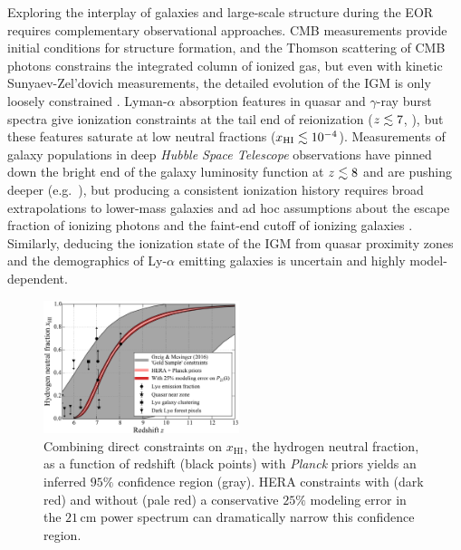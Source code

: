 \documentclass[preprint,11pt]{aastex}
\begin{document}
Exploring the interplay of galaxies and large-scale structure during the EOR
requires complementary observational approaches. CMB measurements 
provide initial conditions for structure formation, and the Thomson
scattering of CMB photons constrains the integrated column of 
ionized gas, but even with kinetic Sunyaev-Zel'dovich measurements, 
the detailed evolution of the IGM 
is only loosely constrained \citep{haiman_holder2003,mortonson_hu2008,mesinger_et_al2012}.
Lyman-$\alpha$ absorption features in quasar and $\gamma$-ray burst spectra give 
ionization constraints at the tail end of reionization 
($z\lesssim7$, \citealt{fan_et_al2006, mcgreer_et_al2015}), but these features 
saturate at low neutral fractions
($x_{\rm HI} \lesssim 10^{-4}$). Measurements of galaxy populations in
deep {\it Hubble Space Telescope} observations 
have pinned down the bright end of the galaxy luminosity function at $z \lesssim 8$
\citep{schenker_et_al2013, bouwens_et_al2015} and are pushing deeper
(e.g.~\citealt{mcleod_et_al2015}), but producing a consistent ionization history
requires broad extrapolations to
lower-mass galaxies and ad hoc assumptions about the escape fraction of
ionizing photons and the faint-end cutoff of ionizing galaxies
\citep{robertson_et_al2015, bouwens_et_al2015_reion}. 
Similarly, deducing the ionization state of the IGM from quasar proximity zones
\citep{carilli_et_al2010, bolton_et_al2011, bosman_becker2015} and the
demographics of Ly-$\alpha$ emitting galaxies \citep{fontana_et_al2010,
schenker_et_al2012, treu_et_al2012, dijkstra_et_al2014} is uncertain and
highly model-dependent.

\begin{figure}[h!]
\centering
    \includegraphics[width=0.51\textwidth,clip]{plots/ionHist.pdf}
  \caption{Combining direct constraints on $x_\text{HI}$, the hydrogen neutral fraction, as a function of redshift (black points) with \emph{Planck} priors yields
an inferred $95\%$ confidence region (gray).  HERA constraints with (dark red) and without (pale red) 
a conservative $25\%$ modeling error in the $21\,\textrm{cm}$ power spectrum can dramatically narrow this confidence region.}
	\label{fig:IonHist}
\end{figure} 
\end{document}
